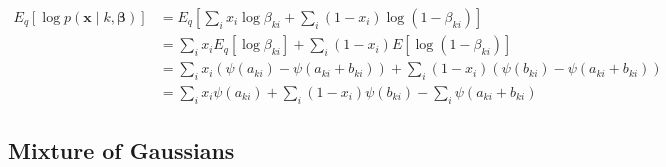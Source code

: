 \documentclass[a4paper]{article}
\begin{document}
			\begin{align}
				E_q\left[ \log p(\mathbf{x} \mid k, \bm{\beta}) \right]
				&= E_q\left[ \sum_i x_i \log \beta_{ki} + \sum_i (1 - x_i) \log (1 - \beta_{ki}) \right] \\
				&= \sum_i x_i E_q\left[ \log \beta_{ki} \right] + \sum_i (1 - x_i) E\left[ \log (1 - \beta_{ki})  \right] \\
				&= \sum_i x_i \left( \psi(a_{ki}) - \psi(a_{ki} + b_{ki}) \right) + \sum_i (1 - x_i) \left( \psi(b_{ki}) - \psi(a_{ki} + b_{ki}) \right) \\
				&= \sum_i x_i \psi(a_{ki}) + \sum_i (1 - x_i) \psi(b_{ki}) - \sum_i \psi(a_{ki} + b_{ki})
			\end{align}

		\subsection*{Mixture of Gaussians}
			
\end{document}
